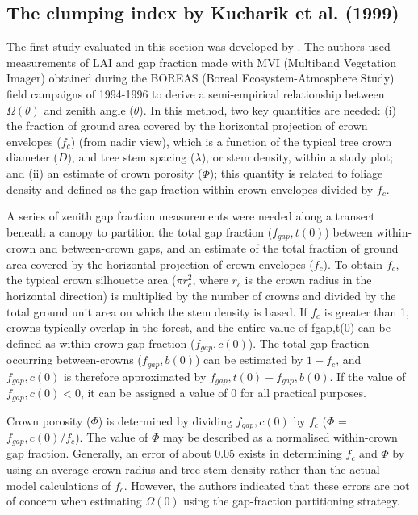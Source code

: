 \subsection{The clumping index by Kucharik et al. (1999)}
The first study evaluated in this section was developed by \citet{Kucharik1999}. The authors used measurements of LAI and gap fraction made with MVI (Multiband Vegetation Imager) \citep{Kucharik1997} obtained during the BOREAS (Boreal Ecosystem-Atmosphere Study) \citep{Sellers1997} field campaigns of 1994-1996 to derive a semi-empirical \citep{Ni-Meister2010} relationship between $\Omega(\theta)$ and zenith angle ($\theta$). In this method, two key quantities are needed: (i) the fraction of ground area covered by the horizontal projection of crown envelopes ($f_c$) (from nadir view), which is a function of the typical tree crown diameter ($D$), and tree stem spacing ($\lambda$), or stem density, within a study plot; and (ii) an estimate of crown porosity ($\Phi$); this quantity is related to foliage density and defined as the gap fraction within crown envelopes divided by $f_c$.
 
A series of zenith gap fraction measurements were needed along a transect beneath a canopy to partition the total gap fraction ($f_{gap},t(0)$) between within-crown and between-crown gaps, and  an estimate of the total fraction of ground area covered by the horizontal projection of crown envelopes ($f_c$). To obtain $f_c$, the typical crown silhouette area ($\pi r_c^2$, where $r_c$ is the crown radius in the horizontal direction) is multiplied by the number of crowns and divided by the total ground unit area on which the stem density is based. If $f_c$ is greater than 1, crowns typically overlap in the forest, and the entire value of fgap,t(0) can be defined as within-crown gap fraction ($f_{gap},c(0)$). The total gap fraction occurring between-crowns ($f_{gap},b(0)$) can be estimated by $1 − f_c$, and $f_{gap},c(0)$ is therefore approximated by $f_{gap},t(0) − f_{gap},b(0)$. If the value of $f_{gap},c(0) < 0$, it can be assigned a value of 0 for all practical purposes. 

Crown porosity ($\Phi$) is determined by dividing $f_{gap},c(0)$ by $f_c$ ($\Phi$ = $f_{gap},c(0)/f_c$). The value of $\Phi$ may be described as a normalised within-crown gap fraction. Generally, an error of about 0.05 exists in determining $f_c$ and $\Phi$ by using an average crown radius and tree stem density rather than the actual model calculations of $f_c$. However, the authors indicated that these errors are not of concern when estimating $\Omega(0)$ using the gap-fraction partitioning strategy.

